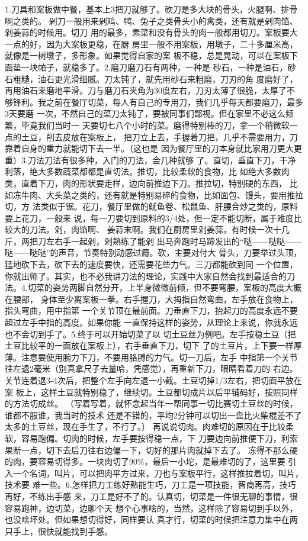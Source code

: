\documentclass[11pt]{article}
\begin{document}
1.刀具和案板做中餐，基本上3把刀就够了。砍刀是多大块的骨头，火腿啊、排骨啊之类的。
剁刀一般用来剁鸡、鸭、兔子之类骨头小的禽类，还有就是剁肉馅、剁姜蒜的时候用。切刀
用的最多，素菜和没有骨头的肉一般都用切刀。案板要大一点的好，因为大案板更稳，在厨
房里一般不用案板，用墩子，二十多厘米高，就像是一树墩子，多形象。如果觉得自家的案
板不稳，总是晃动，可以在案板下面垫一块帕子，就稳多了。2.磨刀磨刀石有两种，一种是
砂石，一种是油石，砂石粗糙，油石更光滑细腻。刀太钝了，就先用砂石来粗磨，刀刃的角
度磨好了，再用油石来磨地平滑。刀与磨刀石夹角为30度左右，刀刃太薄了很脆，太厚了不
够锋利。我之前在餐厅切菜，每人有自己的专用刀，我们几乎每天都要磨刀，最多3天要磨
一次，不然自己的菜刀太钝了，要被同事们鄙视。但在家里不必这么频繁，毕竟我们当时一
天要切七八个小时的菜。磨得特别棒的刀，拿一个稍微软一点的土豆，削去皮放在案板上，
把刀立上去，手握着刀把，几乎不需要用力，刀靠着自身的重力就能切下去一半。（这也是
因为餐厅里的刀本身就比家用刀更大更重）3.刀法刀法有很多种，入门的刀法，会几种就够
了。直切，垂直下刀，干净利落，绝大多数蔬菜都都是直切法。推切，比较柔软的食物，比
如绝大多数肉类，直着下刀，肉的形状要走样，边向前推边下刀。推拉切，特别硬的东西，
比如冻牛肉、大头菜之类的，还有就是特别易碎的食物，比如面包、馒头，要用推拉切，方
法类似于锯。花刀，餐厅里做的鱿鱼卷、松鼠鱼、肝腰合炒之类的，原料要上花刀，一般来
说，每一刀要切到原料的3/4处，但一定不能切断，属于难度比较大的刀法。剁，肉馅啊、
姜蒜末啊。我们在厨房里剁姜蒜，有时候一次十几斤，两把刀左右手一起剁，剁熟练了能剁
出马奔跑时马蹄发出的“哒——哒哒——哒——哒哒”的声音，节奏特别动感过瘾。砍，主要对付大
骨头，刀要举过头顶，猛地砍下去，砍下去的速度要快，还需要花些力气。三刀都能砍到同
一个位置，你就出师了。其实，也不必我讲刀法的理论，实践中大家自然会找到最适合的刀
法。4.切菜的姿势两脚自然分开，上半身微微前倾，但不要弯腰，案板的高度大概在腰部，
身体至少离案板一拳。右手握刀，大拇指自然弯曲，左手放在食物上，指头弯曲，用中指第
一个关节顶在最前面。刀垂直下刀，抬起刀的高度永远不要超过左手中指的高度。如果你能
一直保持这样的姿势，从理论上来说，你就永远也不会切到手了。5.终于可以开始切菜了以
切土豆丝为例吧。左手按稳土豆（把土豆比较平的一面放在案板上），右手垂直下刀，切下
了的土豆片，上下要一样厚薄。注意要使用腕力下刀，不要用胳膊的力气。切一刀后，左手
中指第一个关节往左退2毫米（别真拿尺子去量哈，凭感觉），再重新下刀，眼睛看着刀的
右边。关节连着退3-4次后，把整个左手向左退一小截。土豆切掉1/3左右，把切面平放在案
板上，这样土豆就特别稳了，继续切。土豆都切成片以后平铺码好，按照同样的方法切成丝。
（写着写着，就怀念起当年一帮同事一切比赛切土豆丝的时候，谁都不服谁，我当时的技术
还是不错的，平均2分钟可以切出一盘比火柴棍差不了太多的土豆丝，现在手生了，不行了。）
再说说切肉。肉难切的原因在于比较柔软，容易跑偏。切肉的时候，左手要按得稳一点，下
刀要边向前推便下刀，利索果断一点，切下去后刀往右边偏一下，切好的那片肉就掉下去了。
冻得不那么硬的肉，要容易切得多。一块肉切了90\%，最后一小坨，是最难切的了，这里要
引入一个名词，叫片，可以把肉平方过来，刀也与案板平行，这样推拉着切，叫片，技术要
难一些。6.怎样把刀工练好熟能生巧，刀工是一项技能，智商再高，技巧再好，不练出手感
来，刀工是好不了的。认真切，切菜是一件很无聊的事情，很容易跑神，边切菜，边聊个天
想个心事啥的，当然，这样除了容易切到手以外，也没啥坏处。但如果想切得好，同样要认
真才行，切菜的时候把注意力集中在两只手上，很快就能找到手感。
\end{document}
